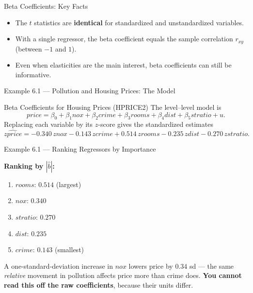 \documentclass[aspectratio=169, 12pt]{beamer}
\begin{document}
\begin{frame}{Beta Coefficients: Key Facts}

  \begin{highlightbox}
    \begin{itemize}
      \item The $t$ statistics are \textbf{identical} for standardized and
            unstandardized variables.
      \item With a single regressor, the beta coefficient equals the sample correlation
            $r_{xy}$ (between $-1$ and $1$).
      \item Even when elasticities are the main interest, beta coefficients can still be
            informative.
    \end{itemize}
  \end{highlightbox}

\end{frame}

\begin{frame}{Example 6.1 --- Pollution and Housing Prices: The Model}

  \begin{examplebox}{Beta Coefficients for Housing Prices (HPRICE2)}
    The level--level model is
    \[
      price = \beta_0 + \beta_1 nox + \beta_2 crime + \beta_3 rooms
            + \beta_4 dist + \beta_5 stratio + u .
    \]
    Replacing each variable by its $z$-score gives the standardized estimates
    \[
      \widehat{zprice} = -0.340\, znox - 0.143\, zcrime + 0.514\, zrooms
                        - 0.235\, zdist - 0.270\, zstratio .
    \]
  \end{examplebox}

\end{frame}

\begin{frame}{Example 6.1 --- Ranking Regressors by Importance}

  \textbf{Ranking by $|\hat b|$:}
  \begin{enumerate}
    \item $rooms$: $0.514$ (largest)
    \item $nox$: $0.340$
    \item $stratio$: $0.270$
    \item $dist$: $0.235$
    \item $crime$: $0.143$ (smallest)
  \end{enumerate}

  \medskip

  \begin{keybox}
    A one-standard-deviation increase in $nox$ lowers price by $0.34$ sd --- the same
    \emph{relative} movement in pollution affects price more than crime does.
    \textbf{You cannot read this off the raw coefficients}, because their units differ.
  \end{keybox}

\end{frame}
\end{document}
